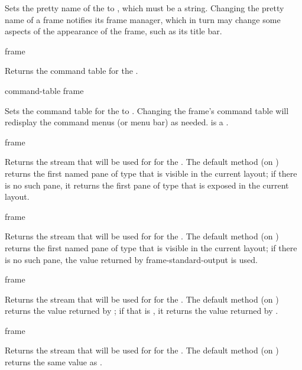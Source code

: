 Sets the pretty name of the   to , which must
be a string.  Changing the pretty name of a frame notifies its frame manager,
which in turn may change some aspects of the appearance of the frame, such as
its title bar.


 {frame}

Returns the command table for the  .

 {command-table frame}

Sets the command table for the   to .
Changing the frame's command table will redisplay the command menus (or menu
bar) as needed.   is a .


 {frame}

Returns the stream that will be used for  for the
 .  The default method (on
) returns the first named pane of type
 that is visible in the current layout; if there is no such
pane, it returns the first pane of type  that is exposed in
the current layout.

 {frame}

Returns the stream that will be used for  for the
 .  The default method (on
) returns the first named pane of type
 that is visible in the current layout; if there is no such
pane, the value returned by {frame-standard-output} is used.

 {frame}

Returns the stream that will be used for  for the 
.  The default method (on ) returns
the value returned by ; if that is , it returns
the value returned by .

 {frame}

Returns the stream that will be used for  for the
 .  The default method (on
) returns the same value as
.



